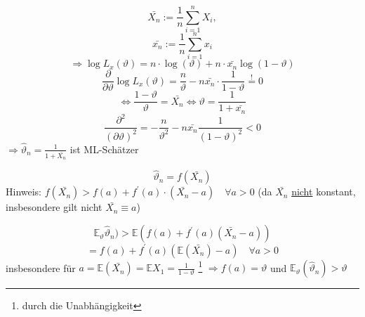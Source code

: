 \documentclass[a4paper,11pt,notitlepage]{report}
\newcommand{\E}{{\ensuremath{\mathbb{E}}}}
\begin{document}
 $$\bar{X_n} := \frac{1}{n} \sum\limits_{i=1}^n{X_i},$$
 $$\bar{x_n} := \frac{1}{n} \sum\limits_{i=1}^n{x_i}$$
 $$\Rightarrow \log L_x (\vartheta) = n \cdot \log(\vartheta) + n \cdot \bar{x_n} \log(1-\vartheta)$$
 $$\frac{\partial}{\partial \vartheta} \log L_x(\vartheta) = \frac{n}{\vartheta} - n \bar{x_n} \cdot \frac{1}{1-\vartheta} \overset{!}{=} 0$$
 $$\Leftrightarrow \frac{1-\vartheta}{\vartheta} = \bar{X_n} \Leftrightarrow \vartheta = \frac{1}{1+ \bar{x_n}}$$
 $$\frac{\partial^2}{(\partial \vartheta)^2} = - \frac{n}{\vartheta^2}- n \bar{x_n} \frac{1}{(1-\vartheta)^2}< 0$$
 $\Rightarrow \hat{\vartheta}_n = \frac{1}{1+ \bar{X_n}}$ ist ML-Schätzer
 
 $$\hat{\vartheta}_n = f(\bar{X_n})$$
 Hinweis: $f(\bar{X_n}) > f(a) + f^\prime(a) \cdot (\bar{X_n}-a) \quad \forall a > 0$ (da $\bar{X_n}$ \underline{nicht} konstant, insbesondere gilt nicht $\bar{X_n} \equiv a$)
 
	$$\E_\vartheta \hat{\vartheta}_n) > \E(f(a) + f^\prime(a) (\bar{X_n} - a))$$
	$$= f(a) + f^\prime(a) (\E(\bar{X_n}) - a) \quad \forall a > 0$$
	insbesondere für $a= \E(\bar{X_n}) = \E X_1 = \frac{1}{1-\vartheta}$ \footnote{durch die Unabhängigkeit} \newline
	$\Rightarrow f(a) = \vartheta$ und $\E_\vartheta(\hat{\vartheta}_n) > \vartheta$ 
 
\end{document}
